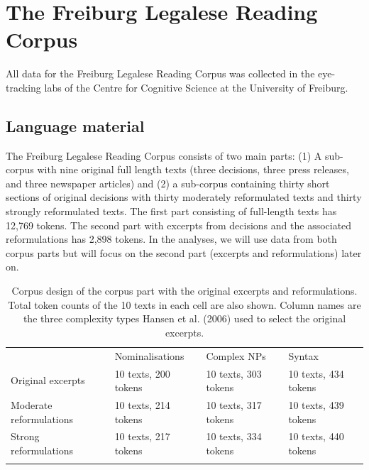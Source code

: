 \documentclass[output=paper]{langsci/langscibook}
\begin{document}
\section{\label{bkm:Ref283224577}The Freiburg Legalese Reading Corpus}

All data for the Freiburg Legalese Reading Corpus was collected in the eye-tracking labs of the Centre for Cognitive Science at the University of Freiburg.

\subsection{\label{bkm:Ref281991215}Language material}

The Freiburg Legalese Reading Corpus consists of two main parts: (1) A sub-corpus with nine original full length texts (three decisions, three press releases, and three newspaper articles) and (2) a sub-corpus containing thirty short sections of original decisions with thirty moderately reformulated texts and thirty strongly reformulated texts. The first part consisting of full-length texts has 12,769 tokens. The second part with excerpts from decisions and the associated reformulations has 2,898 tokens. In the analyses, we will use data from both corpus parts but will focus on the second part (excerpts and reformulations) later on.



\begin{table}
\begin{tabular}{llll} & Nominalisations & Complex NPs & Syntax\\
\lsptoprule
 Original excerpts & 10 texts, 200 tokens & 10 texts, 303 tokens & 10 texts, 434 tokens\\
 Moderate reformulations & 10 texts, 214 tokens & 10 texts, 317 tokens & 10 texts, 439 tokens\\
 Strong reformulations & 10 texts, 217 tokens & 10 texts, 334 tokens & 10 texts, 440 tokens\\
\lspbottomrule
\end{tabular}
\caption{Corpus design of the corpus part with the original excerpts and reformulations. Total token counts of the 10 texts in each cell are also shown. Column names are the three complexity types Hansen et al. (2006) used to select the original excerpts.}
\label{tab:1}
\end{table}
\end{document}
